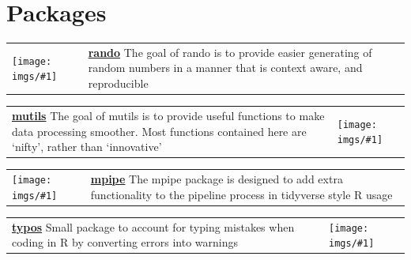 \documentclass[11pt]{article}
\newcommand{\blue}[1]{\textcolor{MyBlue1}{#1}}
\begin{document}



\section{Packages}

\newcommand{\Lpackage}[3]{
\begin{tabularx}{\textwidth}{m{2.2cm}Z}
\texttt{[image: imgs/\#1]} &
\href{#2}{\textbf{\blue{#1}}} #3
\end{tabularx}
}

\newcommand{\Rpackage}[3]{
\begin{tabularx}{\textwidth}{Zm{2.2cm}}
\href{#2}{\textbf{\blue{#1}}} #3 &
\texttt{[image: imgs/\#1]} 
\end{tabularx}
}

\Lpackage{rando}{https://michaelbarrowman.co.uk/rando/}{The goal of rando is to provide easier generating of random numbers in a manner that is context aware, and reproducible}

\Rpackage{mutils}{https://michaelbarrowman.co.uk/mutils/}{The goal of mutils is to provide useful functions to make data processing smoother. Most functions contained here are `nifty', rather than `innovative'}

\Lpackage{mpipe}{https://michaelbarrowman.co.uk/mpipe/}{The mpipe package is designed to add extra functionality to the pipeline process in tidyverse style R usage}

\Rpackage{typos}{https://michaelbarrowman.co.uk/typos/}{Small package to account for typing mistakes when coding in R by converting errors into warnings}
\end{document}
